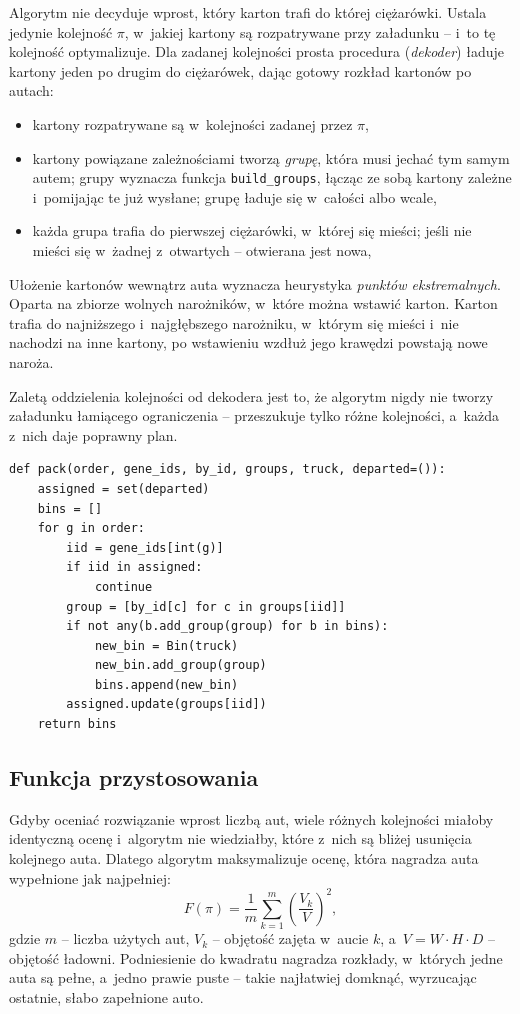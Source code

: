 \documentclass[12pt]{article}
\begin{document}
Algorytm nie decyduje wprost, który karton trafi do której ciężarówki. Ustala jedynie kolejność $\pi$, w~jakiej kartony są rozpatrywane przy załadunku -- i~to tę kolejność optymalizuje. Dla zadanej kolejności prosta procedura (\textit{dekoder}) ładuje kartony jeden po drugim do ciężarówek, dając gotowy rozkład kartonów po autach:
\begin{itemize}
    \item kartony rozpatrywane są w~kolejności zadanej przez $\pi$,
    \item kartony powiązane zależnościami tworzą \textit{grupę}, która musi jechać tym samym autem; grupy wyznacza funkcja \texttt{build\_groups}, łącząc ze sobą kartony zależne i~pomijając te już wysłane; grupę ładuje się w~całości albo wcale,
    \item każda grupa trafia do pierwszej ciężarówki, w~której się mieści; jeśli nie mieści się w~żadnej z~otwartych -- otwierana jest nowa,
\end{itemize}

Ułożenie kartonów wewnątrz auta wyznacza heurystyka \textit{punktów ekstremalnych}. Oparta na zbiorze wolnych narożników, w~które można wstawić karton. Karton trafia do najniższego i~najgłębszego narożniku, w~którym się mieści i~nie nachodzi na inne kartony, po wstawieniu wzdłuż jego krawędzi powstają nowe naroża.

Zaletą oddzielenia kolejności od dekodera jest to, że algorytm nigdy nie tworzy załadunku łamiącego ograniczenia -- przeszukuje tylko różne kolejności, a~każda z~nich daje poprawny plan.

\begin{lstlisting}
def pack(order, gene_ids, by_id, groups, truck, departed=()):
    assigned = set(departed)
    bins = []
    for g in order:
        iid = gene_ids[int(g)]
        if iid in assigned:
            continue
        group = [by_id[c] for c in groups[iid]]
        if not any(b.add_group(group) for b in bins):
            new_bin = Bin(truck)
            new_bin.add_group(group)
            bins.append(new_bin)
        assigned.update(groups[iid])
    return bins
\end{lstlisting}

\subsection{Funkcja przystosowania}

Gdyby oceniać rozwiązanie wprost liczbą aut, wiele różnych kolejności miałoby identyczną ocenę i~algorytm nie wiedziałby, które z~nich są bliżej usunięcia kolejnego auta. Dlatego algorytm maksymalizuje ocenę, która nagradza auta wypełnione jak najpełniej:
\[
F(\pi)=\frac{1}{m}\sum_{k=1}^{m}\left(\frac{V_k}{V}\right)^{2},
\]
gdzie $m$ -- liczba użytych aut, $V_k$ -- objętość zajęta w~aucie $k$, a~$V=W\cdot H\cdot D$ -- objętość ładowni. Podniesienie do kwadratu nagradza rozkłady, w~których jedne auta są pełne, a~jedno prawie puste -- takie najłatwiej domknąć, wyrzucając ostatnie, słabo zapełnione auto.
\end{document}
